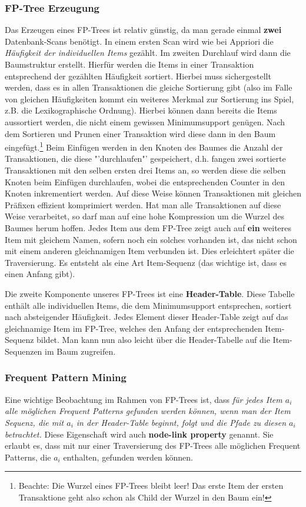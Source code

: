\subsubsection{FP-Tree Erzeugung}
Das Erzeugen eines FP-Trees ist relativ günstig, da man gerade einmal \textbf{zwei}
Datenbank-Scans benötigt. In einem ersten Scan wird wie bei Appriori die
\textit{Häufigkeit der individuellen Items} gezählt. Im zweiten Durchlauf wird dann
die Baumstruktur erstellt. Hierfür werden die Items in einer Transaktion entsprechend
der gezählten Häufigkeit sortiert. Hierbei muss sichergestellt werden, dass es in
allen Transaktionen die gleiche Sortierung gibt (also im Falle von gleichen Häufigkeiten
kommt ein weiteres Merkmal zur Sortierung ins Spiel, z.B. die Lexikographische Ordnung).
Hierbei können dann bereits die Items aussortiert werden, die nicht einem gewissen
Minimumsupport genügen. Nach dem Sortieren und Prunen einer Transaktion wird diese
dann in den Baum eingefügt.\footnote{Beachte: Die Wurzel eines FP-Trees bleibt leer!
Das erste Item der ersten Transaktione geht also schon als Child der Wurzel in den Baum ein!}
Beim Einfügen werden in den Knoten des Baumes die Anzahl der Transaktionen, die
diese "'durchlaufen"' gespeichert, d.h. fangen zwei sortierte Transaktionen mit den
selben ersten drei Items an, so werden diese die selben Knoten beim Einfügen durchlaufen,
wobei die entsprechenden Counter in den Knoten inkrementiert werden. Auf diese Weise
können Transaktionen mit gleichen Präfixen effizient komprimiert werden.
Hat man alle Transaktionen auf diese Weise verarbeitet,
so darf man auf eine hohe Kompression um die Wurzel des Baumes herum hoffen.
Jedes Item aus dem FP-Tree zeigt auch auf \textbf{ein} weiteres Item mit gleichem
Namen, sofern noch ein solches vorhanden ist, das nicht schon mit einem anderen
gleichnamigen Item verbunden ist. Dies erleichtert später die Traversierung. Es
entsteht als eine Art Item-Sequenz (das wichtige ist, dass es einen Anfang gibt).

Die zweite Komponente unseres FP-Trees ist eine \textbf{Header-Table}. Diese
Tabelle enthält alle individuellen Items, die dem Minimumsupport entsprechen, sortiert
nach absteigender Häufigkeit. Jedes Element dieser Header-Table zeigt auf das gleichnamige
Item im FP-Tree, welches den Anfang der entsprechenden Item-Sequenz bildet. Man kann
nun also leicht über die Header-Tabelle auf die Item-Sequenzen im Baum zugreifen.

\subsubsection{Frequent Pattern Mining}
Eine wichtige Beobachtung im Rahmen von FP-Trees ist, dass \textit{für jedes Item
\(a_i\) alle möglichen Frequent Patterns gefunden werden können, wenn man der
Item Sequenz, die mit \(a_i\) in der Header-Table beginnt, folgt und
die Pfade zu diesen \(a_i\) betrachtet.} Diese Eigenschaft
wird auch \textbf{node-link property} genannt. Sie erlaubt es, dass mit nur
einer Traversierung des FP-Trees alle möglichen Frequent Patterns, die \(a_i\) enthalten,
gefunden werden können.

